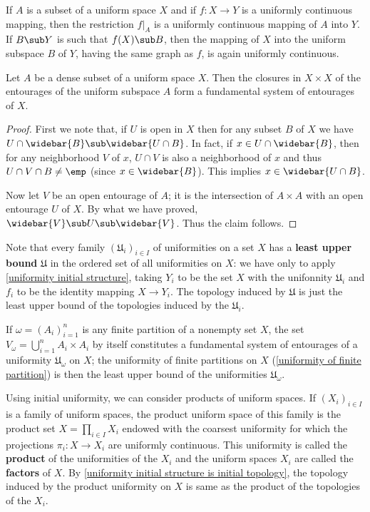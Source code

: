 If $A$ is a subset of a uniform space $X$ and if $f:X\to Y$ is a uniformly continuous mapping, then the restriction $f|_A$ is a uniformly continuous mapping of $A$ into $Y$. If $B\sub Y$ is such that $f(X)\sub B$, then the mapping of $X$ into the uniform subspace $B$ of $Y$, having the same graph as $f$, is again uniformly continuous.
\begin{proposition}\label{uniformity by dense subset}
Let $A$ be a dense subset of a uniform space $X$. Then the closures in $X\times X$ of the entourages of the uniform subspace $A$ form a fundamental system of entourages of $X$.
\end{proposition}
\begin{proof}
First we note that, if $U$ is open in $X$ then for any subset $B$ of $X$ we have $U\cap\widebar{B}\sub\widebar{U\cap B}$. In fact, if $x\in U\cap\widebar{B}$, then for any neighborhood $V$ of $x$, $U\cap V$ is also a neighborhood of $x$ and thus $U\cap V\cap B\neq\emp$ (since $x\in\widebar{B}$). This implies $x\in\widebar{U\cap B}$.\par
Now let $V$ be an open entourage of $A$; it is the intersection of $A\times A$ with an open entourage $U$ of $X$. By what we have proved, $\widebar{V}\sub U\sub\widebar{V}$. Thus the claim follows.
\end{proof}
Note that every family $(\mathfrak{U}_i)_{i\in I}$ of uniformities on a set $X$ has a \textbf{least upper bound} $\mathfrak{U}$ in the ordered set of all uniformities on $X$: we have only to apply \cref{uniformity initial structure}, taking $Y_i$ to be the set $X$ with the unifonnity $\mathfrak{U}_i$ and $f_i$ to be the identity mapping $X\to Y_i$. The topology induced by $\mathfrak{U}$ is just the least upper bound of the topologies induced by the $\mathfrak{U}_i$.
\begin{example}
If $\omega=(A_i)_{i=1}^{n}$ is any finite partition of a nonempty set $X$, the set $V_\omega=\bigcup_{i=1}^{n}A_i\times A_i$ by itself constitutes a fundamental system of entourages of a uniformity $\mathfrak{U}_\omega$ on $X$; the uniformity of finite partitions on $X$ (\cref{uniformity of finite partition}) is then the least upper bound of the uniformities $\mathfrak{U}_\omega$.
\end{example}
Using initial uniformity, we can consider products of uniform spaces. If $(X_i)_{i\in I}$ is a family of uniform spaces, the product uniform space of this family is the product set $X=\prod_{i\in I}X_i$ endowed with the coarsest uniformity for which the projections $\pi_i:X\to X_i$ are uniformly continuous. This uniformity is called the \textbf{product} of the uniformities of the $X_i$ and the uniform spaces $X_i$ are called the \textbf{factors} of $X$. By \cref{uniformity initial structure is initial topology}, the topology induced by the product uniformity on $X$ is same as the product of the topologies of the $X_i$.

